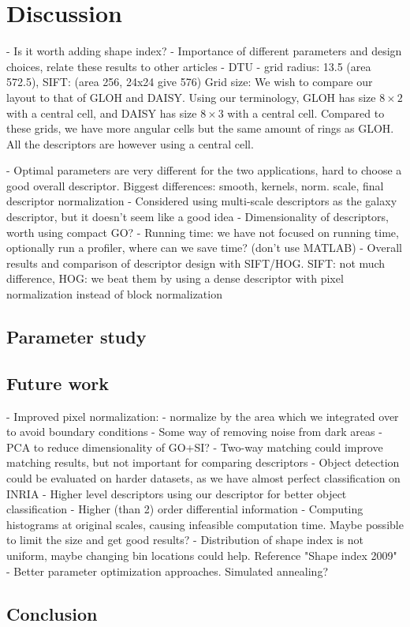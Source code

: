 \documentclass[thesis.tex]{subfiles}
\begin{document}
\chapter{Discussion}

- Is it worth adding shape index?
- Importance of different parameters and design choices, relate these results to other articles
	- DTU
		- grid radius: 13.5 (area 572.5), SIFT: (area 256, 24x24 give 576)
		Grid size:
		We wish to compare our layout to that of GLOH and DAISY. Using our terminology, GLOH has size $8\times2$ with a central cell, and DAISY has size $8 \times 3$ with a central cell. Compared to these grids, we have more angular cells but the same amount of rings as GLOH. All the descriptors are however using a central cell.
		
		
		
- Optimal parameters are very different for the two applications, hard to choose a good overall descriptor. Biggest differences: smooth, kernels, norm. scale, final descriptor normalization
- Considered using multi-scale descriptors as the galaxy descriptor, but it doesn't seem like a good idea
- Dimensionality of descriptors, worth using compact GO?
- Running time: we have not focused on running time, optionally run a profiler, where can we save time? (don't use MATLAB)
- Overall results and comparison of descriptor design with SIFT/HOG. SIFT: not much difference, HOG: we beat them by using a dense descriptor with pixel normalization instead of block normalization

\section{Parameter study}


\section{Future work} %
- Improved pixel normalization:
	- normalize by the area which we integrated over to avoid boundary conditions
	- Some way of removing noise from dark areas
- PCA to reduce dimensionality of GO+SI?
- Two-way matching could improve matching results, but not important for comparing descriptors
- Object detection could be evaluated on harder datasets, as we have almost perfect classification on INRIA
- Higher level descriptors using our descriptor for better object classification
- Higher (than 2) order differential information
- Computing histograms at original scales, causing infeasible computation time. Maybe possible to limit the size and get good results?
- Distribution of shape index is not uniform, maybe changing bin locations could help. Reference "Shape index 2009"
- Better parameter optimization approaches. Simulated annealing?

\section{Conclusion}

\subbibliography
\end{document}
